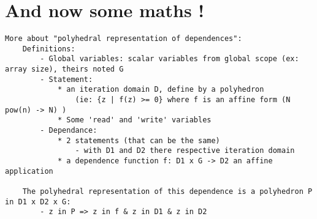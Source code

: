 	\section{And now some maths !}

\begin{verbatim}
More about "polyhedral representation of dependences":
	Definitions:
		- Global variables: scalar variables from global scope (ex: array size), theirs noted G
		- Statement:
			* an iteration domain D, define by a polyhedron 
				(ie: {z | f(z) >= 0} where f is an affine form (N pow(n) -> N) )
			* Some 'read' and 'write' variables
		- Dependance:
			* 2 statements (that can be the same)
				- with D1 and D2 there respective iteration domain
			* a dependence function f: D1 x G -> D2 an affine application
			
	The polyhedral representation of this dependence is a polyhedron P in D1 x D2 x G:
		- z in P => z in f & z in D1 & z in D2
\end{verbatim}
